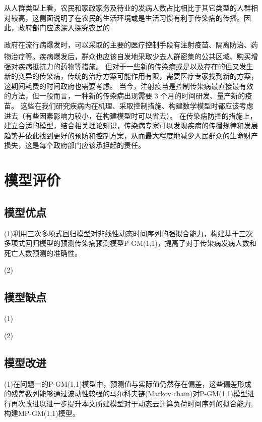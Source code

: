 \documentclass{whutmod}
\begin{document}
从人群类型上看，农民和家政家务及待业的发病人数占比相比于其它类型的人群相对较高，这侧面说明了在农民的生活环境或是生活习惯有利于传染病的传播。因此，政府部门应该深入探究农民的

政府在流行病爆发时，可以采取的主要的医疗控制手段有注射疫苗、隔离防治、药物治疗等\textsuperscript{\cite{bib:thirteen}}。疾病爆发后，群众也应该自发地采取少去人群密集的公共区域、购买增强对疾病抵抗力的药物等措施。
但对于一些新的传染病或是以及存在的但又发生新的变异的传染病，传统的治疗方案可能作用有限，需要医疗专家找到新的方案，这期间耗费的时间政府也需要考虑。
当今，注射疫苗是控制传染病最直接最有效的方法，但一般而言，一种新的传染病出现需要 3 个月的时间研发、量产新的疫苗。
这些在我们研究疾病内在机理、采取控制措施、构建数学模型时都应该考虑进去（有些因素影响力较小，在构建模型时可以省去）。
在传染病防控的措施上，建立合适的模型，结合相关理论知识，传染病专家可以发现疾病的传播规律和发展趋势并依此找到更好的预防和控制方案，从而最大程度地减少人民群众的生命财产损失，这是每个政府部门应该承担起的责任。

\section{模型评价}

\subsection{模型优点}
(1)利用三次多项式回归模型对非线性动态时间序列的强拟合能力，构建基于三次多项式回归模型的预测传染病预测模型P-GM(1,1)，提高了对于传染病发病人数和死亡人数预测的准确性。

(2)
\subsection{模型缺点}
(1)

(2)
\subsection{模型改进}
(1)在问题一的P-GM(1,1)模型中，预测值与实际值仍然存在偏差，这些偏差形成的残差数列能够通过波动性较强的马尔科夫链(Markov chain)对P-GM(1,1)模型进行再次改进以进一步提升本文所建模型对于动态云计算负荷时间序列的拟合能力,构建MP-GM(1,1)模型。
\end{document}

